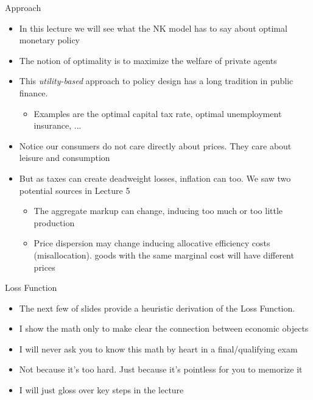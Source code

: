\documentclass[11pt,aspectratio=169,xcolor={dvipsnames},hyperref={pdftex,pdfpagemode=UseNone,hidelinks,pdfdisplaydoctitle=true},usepdftitle=false]{beamer}
\begin{document}
\begin{frame}{Approach}
\begin{itemize}
\item In this lecture we will see what the NK model has to say about optimal monetary policy
\item The notion of optimality is to maximize the welfare of private agents
\item This \textit{utility-based} approach to policy design has a long tradition in public finance.
\begin{itemize}
\item Examples are the optimal capital tax rate, optimal unemployment insurance, ...
\end{itemize}
\item Notice our consumers do not care directly about prices. They care about leisure and consumption
\item But as taxes can create deadweight losses, inflation can too. We saw two potential sources in Lecture 5
\begin{itemize}
\item The aggregate markup can change, inducing too much or too little production
\item Price dispersion may change inducing allocative efficiency costs (misallocation). goods with the same marginal cost will have different prices
\end{itemize}
\end{itemize}
\end{frame}

\begin{frame}{Loss Function}
\begin{itemize}
\item The next few of slides provide a heuristic derivation of the Loss Function.
\item I show the math only to make clear the connection between economic objects
\item I will never ask you to know this math by heart in a final/qualifying exam
\item Not because it's too hard. Just because it's pointless for you to memorize it
\item I will just gloss over key steps in the lecture
\end{itemize}
\end{frame}
\end{document}
